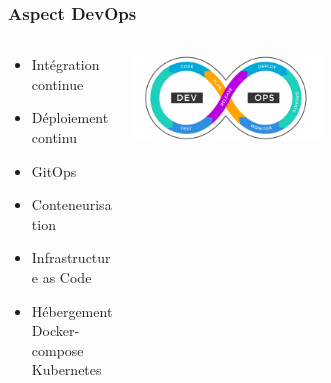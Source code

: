 \documentclass[aspectratio=169]{beamer}
\begin{document}
    \begin{frame}%
        \frametitle{Aspect DevOps}
        \begin{columns}
            \begin{column}{0.5\textwidth}
                \begin{itemize}
                    \item Intégration continue
                    \item Déploiement continu
                    \item GitOps
                    \item Conteneurisation
                    \item Infrastructure as Code
                    \item Hébergement
                    \subitem Docker-compose
                    \subitem Kubernetes
                \end{itemize}

            \end{column}
            \begin{column}{1\textwidth}
                \begin{flushleft}
                    \includegraphics[width=0.50\textwidth]{imgs/devops}\label{fig:devops2}
                \end{flushleft}
            \end{column}
        \end{columns}
    \end{frame}
\end{document}
